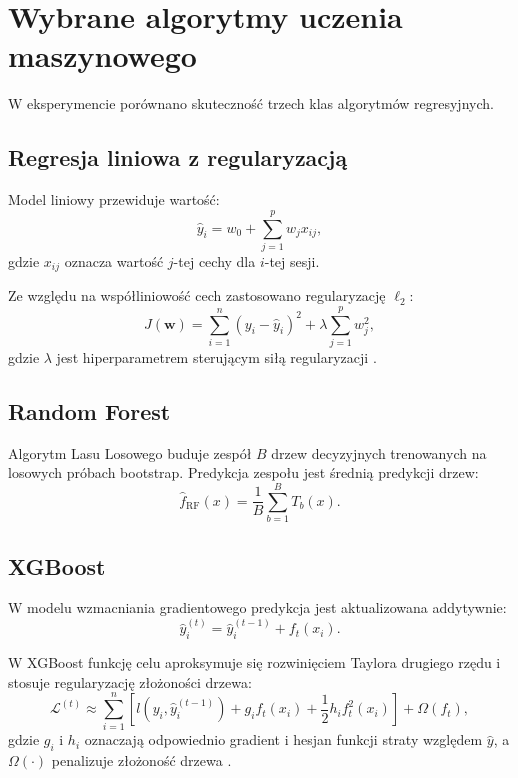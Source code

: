 \section{Wybrane algorytmy uczenia maszynowego}

W eksperymencie porównano skuteczność trzech klas algorytmów regresyjnych.

\subsection{Regresja liniowa z regularyzacją}

Model liniowy przewiduje wartość:
\begin{equation}
\label{eq:linear_pred}
\hat{y}_i = w_0 + \sum_{j=1}^{p} w_j x_{ij},
\end{equation}
gdzie $x_{ij}$ oznacza wartość $j$-tej cechy dla $i$-tej sesji.

Ze względu na współliniowość cech zastosowano regularyzację $\ell_2$:
\begin{equation}
\label{eq:ridge_objective}
J(\mathbf{w}) = \sum_{i=1}^{n}\left(y_i - \hat{y}_i\right)^2 + \lambda \sum_{j=1}^{p} w_j^2,
\end{equation}
gdzie $\lambda$ jest hiperparametrem sterującym siłą regularyzacji \cite{hastie2009esl}.

\subsection{Random Forest}

Algorytm Lasu Losowego buduje zespół $B$ drzew decyzyjnych trenowanych na losowych próbach bootstrap.
Predykcja zespołu jest średnią predykcji drzew:
\begin{equation}
\label{eq:rf_pred}
\hat{f}_{\mathrm{RF}}(x) = \frac{1}{B}\sum_{b=1}^{B} T_b(x).
\end{equation}
\cite{james2021isl,sanjaykumar2024athlete}

\subsection{XGBoost}

W modelu wzmacniania gradientowego predykcja jest aktualizowana addytywnie:
\begin{equation}
\label{eq:xgb_update}
\hat{y}_i^{(t)} = \hat{y}_i^{(t-1)} + f_t(x_i).
\end{equation}

W XGBoost funkcję celu aproksymuje się rozwinięciem Taylora drugiego rzędu i stosuje regularyzację złożoności drzewa:
\begin{equation}
\label{eq:xgb_objective}
\mathcal{L}^{(t)} \approx
\sum_{i=1}^{n}\left[l\!\left(y_i,\hat{y}_i^{(t-1)}\right) + g_i f_t(x_i) + \frac{1}{2}h_i f_t^2(x_i)\right] + \Omega(f_t),
\end{equation}
gdzie $g_i$ i $h_i$ oznaczają odpowiednio gradient i hesjan funkcji straty względem $\hat{y}$, a $\Omega(\cdot)$ penalizuje złożoność drzewa \cite{stockwell2023mlftp}.

